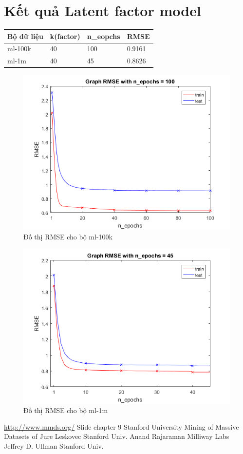 \documentclass[a4paper,10pt]{report}
\begin{document}
\section{Kết quả Latent factor model}
\begin{center}
\begin{longtable}{|l|l|l|l|}
\hline
Bộ dữ liệu & k(factor) & n\_eopchs & RMSE \\
\hline
ml-100k & 40 & 100 & 0.9161 \\
ml-1m & 40 & 45 & 0.8626 \\
\hline
\end{longtable}
\end{center}
\begin{center}
\begin{figure}[h]
\includegraphics[scale=1]{RMSE.png}
\caption{Đồ thị RMSE cho bộ ml-100k}
\end{figure}
\end{center}
\begin{center}
\begin{figure}[h]
\includegraphics[scale=1]{RMSE!.png}
\caption{Đồ thị RMSE cho bộ ml-1m}
\end{figure}
\end{center}
\begin{thebibliography}{5}
\url{http://www.mmds.org/}
Slide chapter 9 Stanford University
Mining of Massive Datasets of Jure Leskovec Stanford Univ. Anand Rajaraman Milliway Labs Jeffrey D. Ullman Stanford Univ.
\end{thebibliography}
\end{document}

